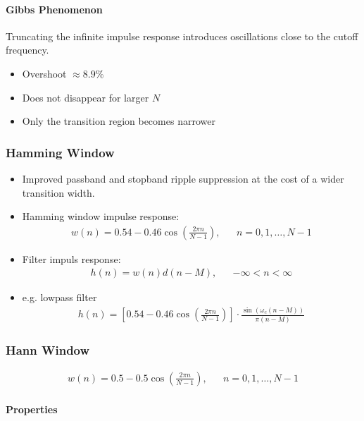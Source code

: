 \paragraph{Gibbs Phenomenon}

Truncating the infinite impulse response introduces oscillations close
to the cutoff frequency.

\begin{itemize}
\item Overshoot $\approx 8.9\%$
\item Does not disappear for larger $N$
\item Only the transition region becomes narrower
\end{itemize}

\subsubsection{Hamming Window}
\begin{itemize}
	\item Improved passband and stopband ripple suppression at the cost of a wider transition width.
	\item Hamming window impulse response:
	\begin{align*}
		w(n) = 0.54 -0.46\cos\left(\frac{2\pi n}{N-1}\right),&&n= 0,1,\dots,N-1
	\end{align*}
	\item Filter impuls response:
	\begin{align*}
		h(n) = w(n)d(n-M),&&-\infty < n < \infty
	\end{align*}
	\item e.g. lowpass filter
	\begin{align*}
		h(n) = \left[0.54 -0.46\cos\left(\frac{2\pi n}{N-1}\right)\right]\cdot\frac{\sin(\omega_c(n-M))}{\pi (n-M)}
	\end{align*}
\end{itemize}

\subsubsection{Hann Window}
\begin{align*}
  w(n) = 0.5 - 0.5\cos\left(\frac{2\pi n}{N-1}\right),&&n= 0,1,\ldots,N-1
\end{align*}

\paragraph{Properties}

